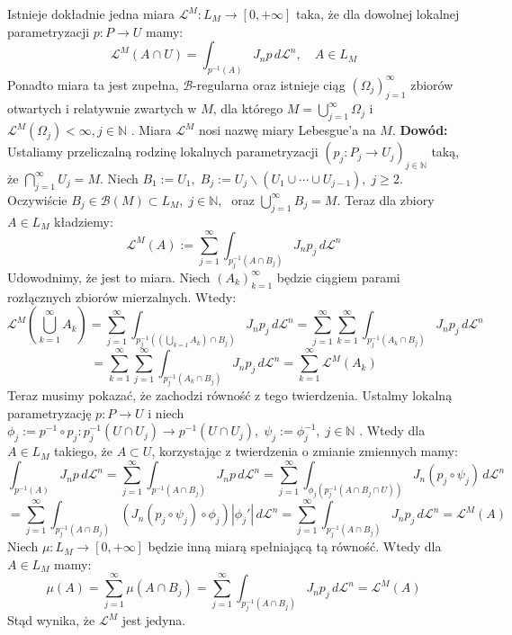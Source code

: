 \begin{tw}
	Istnieje dokładnie jedna miara $\mathcal{L}^M: L_M \rightarrow [0, +\infty]$ taka, że dla dowolnej lokalnej parametryzacji $p: P \rightarrow U$ mamy: $$
		\mathcal{L}^M(A \cap U) = \int_{p^{-1}(A)} J_np \, d \mathcal{L}^n, \quad A \in L_M
	$$
	Ponadto miara ta jest zupełna, $\mathcal{B}$-regularna oraz istnieje ciąg $(\Omega_j)_{j=1}^{\infty}$ zbiorów otwartych i relatywnie zwartych w $M$, dla którego $M = \bigcup_{j=1}^{\infty} \Omega_j$ i $\mathcal{L}^M(\Omega_j) < \infty, j \in \mathbb{N}$ . Miara $\mathcal{L}^M$ nosi nazwę miary Lebesgue'a na $M$.
	\newline
	\textbf{Dowód:}\newline
	Ustaliamy przeliczalną rodzinę lokalnych parametryzacji $(p_j: P_j \rightarrow U_j)_{j \in \mathbb{N}}$ taką, że $\bigcap_{j=1}^{\infty} U_j = M$. Niech $B_1:= U_1, \; B_j := U_j \backslash (U_1 \cup \cdots \cup U_{j-1}), \; j \geq 2$. Oczywiście $B_j \in \mathcal{B}(M) \subset L_M, \; j \in \mathbb{N},\;$ oraz $\bigcup_{j=1}^{\infty} B_j = M$. Teraz dla zbiory $A \in L_M$ kładziemy: $$
		\mathcal{L}^M(A) := \sum_{j=1}^{\infty} \int_{p_j^{-1}(A \cap B_j)} J_np_j \, d\mathcal{L}^n
	$$
	Udowodnimy, że jest to miara. Niech $(A_k)_{k=1}^{\infty}$ będzie ciągiem parami rozłącznych zbiorów mierzalnych. Wtedy: 
	$$
		\mathcal{L}^M(\bigcup_{k=1}^{\infty} A_k) 
		= \sum^{\infty}_{j=1} \int_{p_j^{-1}((\bigcup_{k=1} A_k) \cap B_j)} J_np_j \, d\mathcal{L}^n
		= \sum_{j=1}^{\infty} \sum_{k=1}^{\infty} \int_{p_j^{-1}(A_k \cap B_j)} J_np_j \, d \mathcal{L}^n
	$$
	$$
		= \sum_{k=1}^{\infty} \sum_{j=1}^{\infty} \int_{p_j^{-1}(A_k \cap B_j)} J_np_j \, d \mathcal{L}^n
		= \sum_{k=1}^{\infty} \mathcal{L}^M(A_k)
	$$
	Teraz musimy pokazać, że zachodzi równość z tego twierdzenia. Ustalmy lokalną parametryzację $p: P \rightarrow U$  i niech $\phi_j := p^{-1} \circ p_j:p^{-1}_j(U \cap U_j) \rightarrow p^{-1}(U \cap U_j), \; \psi_j := \phi_j^{-1}, \; j \in \mathbb{N}$ . Wtedy dla $A \in L_M$ takiego, że $A \subset U$, korzystając z twierdzenia o zmianie zmiennych mamy: $$
		\int_{p^{-1}(A)} J_np \, d \mathcal{L}^n
		= \sum_{j=1}^{\infty} \int_{p^{-1}(A \cap B_j)} J_np \, d \mathcal{L}^n
		= \sum_{j=1}^{\infty} \int_{\phi_j(p_j^{-1}(A \cap B_j \cap U))} J_n(p_j \circ \psi_j) \, d \mathcal{L}^n
	$$
	$$
		= \sum_{j=1}^{\infty} \int_{p_j^{-1}(A \cap B_j)} (J_n(p_j \circ \psi_j) \circ \phi_j) |\phi_j'| \, d \mathcal{L}^n
		= \sum_{j=1}^{\infty} \int_{p_j^{-1}(A \cap B_j)} J_np_j \, d \mathcal{L}^n = \mathcal{L}^M(A)
	$$
	Niech $\mu: L_M \rightarrow [0, +\infty]$ będzie inną miarą spełniającą tą równość. Wtedy dla $A \in L_M$ mamy: $$
		\mu(A) = \sum_{j=1}^{\infty} \mu(A \cap B_j) = \sum_{j=1}^{\infty} \int_{p_j^{-1}(A \cap B_j)} J_np_j \, d \mathcal{L}^n = \mathcal{L}^M(A)
	$$
	Stąd wynika, że $\mathcal{L}^M$ jest jedyna.
\end{tw}